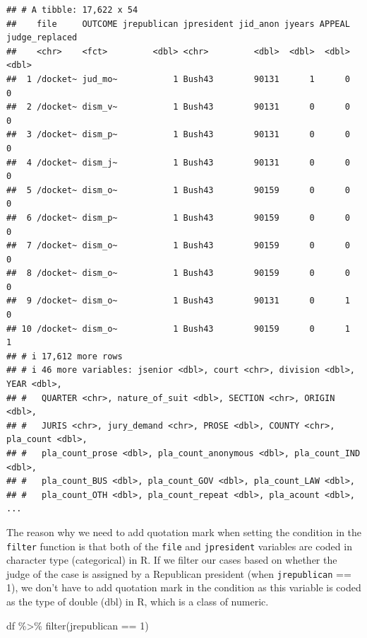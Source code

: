 \documentclass[
]{article}
\newenvironment{Shaded}{\begin{snugshade}}{\end{snugshade}}
\newcommand{\DecValTok}[1]{\textcolor[rgb]{0.00,0.00,0.81}{#1}}
\newcommand{\FunctionTok}[1]{\textcolor[rgb]{0.00,0.00,0.00}{#1}}
\newcommand{\NormalTok}[1]{#1}
\newcommand{\SpecialCharTok}[1]{\textcolor[rgb]{0.00,0.00,0.00}{#1}}
\begin{document}
\begin{verbatim}
## # A tibble: 17,622 x 54
##    file     OUTCOME jrepublican jpresident jid_anon jyears APPEAL judge_replaced
##    <chr>    <fct>         <dbl> <chr>         <dbl>  <dbl>  <dbl>          <dbl>
##  1 /docket~ jud_mo~           1 Bush43        90131      1      0              0
##  2 /docket~ dism_v~           1 Bush43        90131      0      0              0
##  3 /docket~ dism_p~           1 Bush43        90131      0      0              0
##  4 /docket~ dism_j~           1 Bush43        90131      0      0              0
##  5 /docket~ dism_o~           1 Bush43        90159      0      0              0
##  6 /docket~ dism_p~           1 Bush43        90159      0      0              0
##  7 /docket~ dism_o~           1 Bush43        90159      0      0              0
##  8 /docket~ dism_o~           1 Bush43        90159      0      0              0
##  9 /docket~ dism_o~           1 Bush43        90131      0      1              0
## 10 /docket~ dism_o~           1 Bush43        90159      0      1              1
## # i 17,612 more rows
## # i 46 more variables: jsenior <dbl>, court <chr>, division <dbl>, YEAR <dbl>,
## #   QUARTER <chr>, nature_of_suit <dbl>, SECTION <chr>, ORIGIN <dbl>,
## #   JURIS <chr>, jury_demand <chr>, PROSE <dbl>, COUNTY <chr>, pla_count <dbl>,
## #   pla_count_prose <dbl>, pla_count_anonymous <dbl>, pla_count_IND <dbl>,
## #   pla_count_BUS <dbl>, pla_count_GOV <dbl>, pla_count_LAW <dbl>,
## #   pla_count_OTH <dbl>, pla_count_repeat <dbl>, pla_acount <dbl>, ...
\end{verbatim}

The reason why we need to add quotation mark when setting the condition
in the \texttt{filter} function is that both of the \texttt{file} and
\texttt{jpresident} variables are coded in character type (categorical)
in R. If we filter our cases based on whether the judge of the case is
assigned by a Republican president (when \texttt{jrepublican} == 1), we
don't have to add quotation mark in the condition as this variable is
coded as the type of double (dbl) in R, which is a class of numeric.

\begin{Shaded}
\begin{Highlighting}[]
\NormalTok{df }\SpecialCharTok{\%\textgreater{}\%} \FunctionTok{filter}\NormalTok{(jrepublican }\SpecialCharTok{==} \DecValTok{1}\NormalTok{)}
\end{Highlighting}
\end{Shaded}
\end{document}
